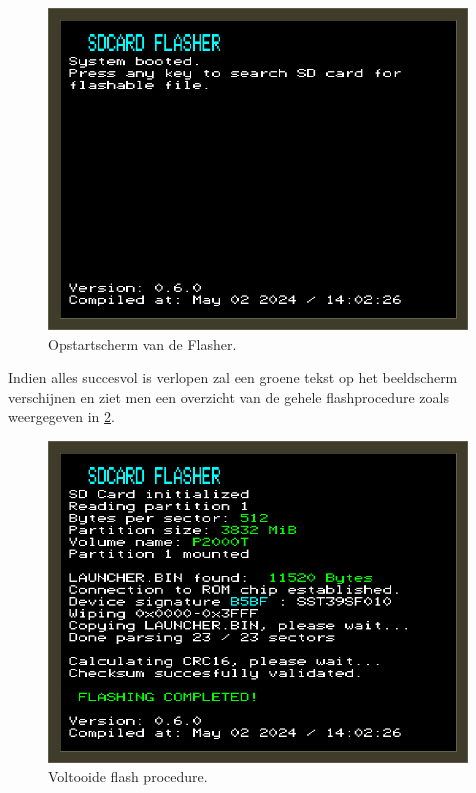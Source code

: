 \begin{figure}[h!]
    \centering
    \includegraphics[width=0.99\textwidth]{img/flasher_boot.png}
    \caption{Opstartscherm van de Flasher.}
    \label{fig:flasher-boot}
\end{figure}

Indien alles succesvol is verlopen zal een groene tekst op het beeldscherm verschijnen en ziet men een overzicht van de gehele flashprocedure zoals weergegeven in \cref{fig:flasher-done}.


\begin{figure}[h!]
    \centering
    \includegraphics[width=0.99\textwidth]{img/flasher_done.png}
    \caption{Voltooide flash procedure.}
    \label{fig:flasher-done}
\end{figure}

